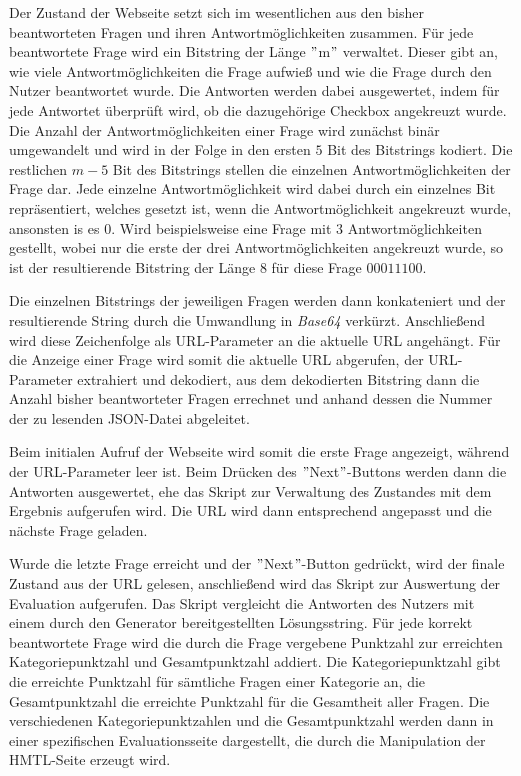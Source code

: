 Der Zustand der Webseite setzt sich im wesentlichen aus den bisher beantworteten Fragen und ihren Antwortmöglichkeiten zusammen. Für jede beantwortete Frage wird ein Bitstring der Länge $"$m$"$ verwaltet. Dieser gibt an, wie viele Antwortmöglichkeiten die Frage aufwieß und wie die Frage durch den Nutzer beantwortet wurde. Die Antworten werden dabei ausgewertet, indem für jede Antwortet überprüft wird, ob die dazugehörige Checkbox angekreuzt wurde. Die Anzahl der Antwortmöglichkeiten einer Frage wird zunächst binär umgewandelt und wird in der Folge in den ersten $5$ Bit des Bitstrings kodiert. Die restlichen $m - 5$ Bit des Bitstrings stellen die einzelnen Antwortmöglichkeiten der Frage dar. Jede einzelne Antwortmöglichkeit wird dabei durch ein einzelnes Bit repräsentiert, welches gesetzt ist, wenn die Antwortmöglichkeit angekreuzt wurde, ansonsten is es $0$. Wird beispielsweise eine Frage mit $3$ Antwortmöglichkeiten gestellt, wobei nur die erste der drei Antwortmöglichkeiten angekreuzt wurde, so ist der resultierende Bitstring der Länge $8$ für diese Frage $00011100$.


Die einzelnen Bitstrings der jeweiligen Fragen werden dann konkateniert und der resultierende String durch die Umwandlung in \textit{Base64} verkürzt. Anschließend wird diese Zeichenfolge als URL-Parameter an die aktuelle URL angehängt. Für die Anzeige einer Frage wird somit die aktuelle URL abgerufen, der URL-Parameter extrahiert und dekodiert, aus dem dekodierten Bitstring dann die Anzahl bisher beantworteter Fragen errechnet und anhand dessen die Nummer der zu lesenden JSON-Datei abgeleitet.

Beim initialen Aufruf der Webseite wird somit die erste Frage angezeigt, während der URL-Parameter leer ist. Beim Drücken des $"$Next$"$-Buttons werden dann die Antworten ausgewertet, ehe das Skript zur Verwaltung des Zustandes mit dem Ergebnis aufgerufen wird. Die URL wird dann entsprechend angepasst und die nächste Frage geladen.

Wurde die letzte Frage erreicht und der $"$Next$"$-Button gedrückt, wird der finale Zustand aus der URL gelesen, anschließend wird das Skript zur Auswertung der Evaluation aufgerufen. Das Skript vergleicht die Antworten des Nutzers mit einem durch den Generator bereitgestellten Lösungsstring. Für jede korrekt beantwortete Frage wird die durch die Frage vergebene Punktzahl zur erreichten Kategoriepunktzahl und Gesamtpunktzahl addiert. Die Kategoriepunktzahl gibt die erreichte Punktzahl für sämtliche Fragen einer Kategorie an, die Gesamtpunktzahl die erreichte Punktzahl für die Gesamtheit aller Fragen. Die verschiedenen Kategoriepunktzahlen und die Gesamtpunktzahl werden dann in einer spezifischen Evaluationsseite dargestellt, die durch die Manipulation der HMTL-Seite erzeugt wird. 


